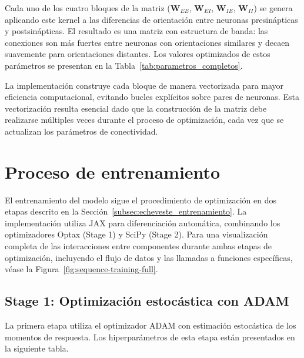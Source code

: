 Cada uno de los cuatro bloques de la matriz ($\mathbf{W}_{EE}$, $\mathbf{W}_{EI}$, $\mathbf{W}_{IE}$, $\mathbf{W}_{II}$) se genera aplicando este kernel a las diferencias de orientación entre neuronas presinápticas y postsinápticas. El resultado es una matriz con estructura de banda: las conexiones son más fuertes entre neuronas con orientaciones similares y decaen suavemente para orientaciones distantes. Los valores optimizados de estos parámetros se presentan en la Tabla~\ref{tab:parametros_completos}.

La implementación construye cada bloque de manera vectorizada para mayor eficiencia computacional, evitando bucles explícitos sobre pares de neuronas. Esta vectorización resulta esencial dado que la construcción de la matriz debe realizarse múltiples veces durante el proceso de optimización, cada vez que se actualizan los parámetros de conectividad.


\section{Proceso de entrenamiento}
\label{sec:impl_entrenamiento}

El entrenamiento del modelo sigue el procedimiento de optimización en dos etapas descrito en la Sección~\ref{subsec:echeveste_entrenamiento}. La implementación utiliza JAX para diferenciación automática, combinando los optimizadores Optax (Stage 1) y SciPy (Stage 2). Para una visualización completa de las interacciones entre componentes durante ambas etapas de optimización, incluyendo el flujo de datos y las llamadas a funciones específicas, véase la Figura~\ref{fig:sequence-training-full}.

\subsection{Stage 1: Optimización estocástica con ADAM}
\label{subsec:impl_stage1}

La primera etapa utiliza el optimizador \acrshort{ADAM} con estimación estocástica de los momentos de respuesta. Los hiperparámetros de esta etapa están presentados en la siguiente tabla.

